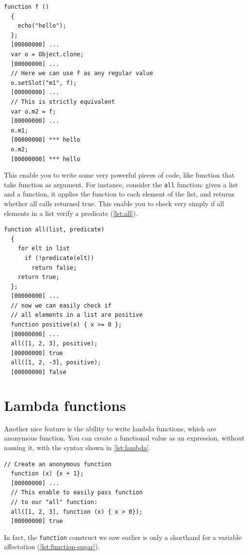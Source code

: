 \documentclass[openright,twoside,12pt]{report}
\newcommand{\lst}[1]{\autoref{lst:#1}}
\begin{document}
\begin{lstlisting}[caption=First class functions,
  label=lst:first-class-functions]
  function f ()
  {
    echo("hello");
  };
  [00000000] ...
  var o = Object.clone;
  [00000000] ...
  // Here we can use f as any regular value
  o.setSlot("m1", f);
  [00000000] ...
  // This is strictly equivalent
  var o.m2 = f;
  [00000000] ...
  o.m1;
  [00000000] *** hello
  o.m2;
  [00000000] *** hello
\end{lstlisting}

This enable you to write some very powerful pieces of code, like
function that take function as argument. For instance, consider the
\texttt{all} function: given a list and a function, it applies the
function to each element of the list, and returns whether all calls
returned true. This enable you to check very simply if all elements in
a list verify a predicate (\lst{all}).

\begin{lstlisting}[caption=Functional programming: the \texttt{all}
  function, label=lst:all]
  function all(list, predicate)
  {
    for elt in list
      if (!predicate(elt))
        return false;
    return true;
  };
  [00000000] ...
  // now we can easily check if
  // all elements in a list are positive
  function positive(x) { x >= 0 };
  [00000000] ...
  all([1, 2, 3], positive);
  [00000000] true
  all([1, 2, -3], positive);
  [00000000] false
\end{lstlisting}

\section{Lambda functions}

Another nice feature is the ability to write lambda functions, which
are anonymous function. You can create a functional value as an
expression, without naming it, with the syntax shown in \lst{lambda}.

\begin{lstlisting}[caption=Lambda function, label=lst:lambda]
  // Create an anonymous function
  function (x) {x + 1};
  [00000000] ...
  // This enable to easily pass function
  // to our "all" function:
  all([1, 2, 3], function (x) { x > 0});
  [00000000] true
\end{lstlisting}

In fact, the \texttt{function} construct we saw earlier is only a
shorthand for a variable affectation (\lst{function-sugar}).
\end{document}
